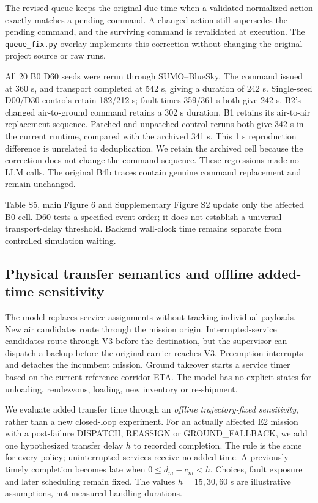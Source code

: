 \documentclass[11pt,a4paper]{article}
\begin{document}
The revised queue keeps the original due time when a validated normalized action exactly matches a pending command. A changed action still supersedes the pending command, and the surviving command is revalidated at execution. The \nolinkurl{queue_fix.py} overlay implements this correction without changing the original project source or raw runs.

All 20 B0 D60 seeds were rerun through SUMO--BlueSky. The command issued at 360 s, and transport completed at 542 s, giving a duration of 242 s. Single-seed D00/D30 controls retain 182/212 s; fault times 359/361 s both give 242 s. B2's changed air-to-ground command retains a 302 s duration. B1 retains its air-to-air replacement sequence. Patched and unpatched control reruns both give 342 s in the current runtime, compared with the archived 341 s. This 1 s reproduction difference is unrelated to deduplication. We retain the archived cell because the correction does not change the command sequence. These regressions made no LLM calls. The original B4b traces contain genuine command replacement and remain unchanged.

Table S5, main Figure 6 and Supplementary Figure S2 update only the affected B0 cell. D60 tests a specified event order; it does not establish a universal transport-delay threshold. Backend wall-clock time remains separate from controlled simulation waiting.

\subsection{Physical transfer semantics and offline added-time sensitivity}

The model replaces service assignments without tracking individual payloads. New air candidates route through the mission origin. Interrupted-service candidates route through V3 before the destination, but the supervisor can dispatch a backup before the original carrier reaches V3. Preemption interrupts and detaches the incumbent mission. Ground takeover starts a service timer based on the current reference corridor ETA. The model has no explicit states for unloading, rendezvous, loading, new inventory or re-shipment.

We evaluate added transfer time through an \emph{offline trajectory-fixed sensitivity}, rather than a new closed-loop experiment. For an actually affected E2 mission with a post-failure DISPATCH, REASSIGN or GROUND\_FALLBACK, we add one hypothesized transfer delay $h$ to recorded completion. The rule is the same for every policy; uninterrupted services receive no added time. A previously timely completion becomes late when $0\le d_m-c_m<h$. Choices, fault exposure and later scheduling remain fixed. The values $h=15,30,60$ s are illustrative assumptions, not measured handling durations.
\end{document}
